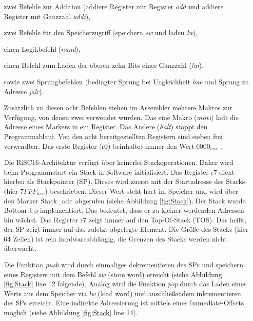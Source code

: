 \documentclass[fleqn, a4paper, 11pt]{article}       %
\begin{document}
\begin{compactitem}
     \item zwei Befehle zur Addition (addiere Register mit Register \emph{add} und addiere Register mit Ganzzahl \emph{addi}),
     \item zwei Befehle für den Speicherzugriff (speichern \emph{sw} und laden \emph{lw}),
     \item einen Logikbefehl (\emph{nand}),
     \item einen Befehl zum Laden der oberen zehn Bits einer Ganzzahl (\emph{lui}),
     \item sowie zwei Sprungbefehlen (bedingter Sprung bei Ungleichheit \emph{bne} und Sprung zu Adresse \emph{jalr}).
 \end{compactitem}


\noindent Zusätzlich zu diesen acht Befehlen stehen im Assembler mehrere Makros zur Verfügung, von denen zwei verwendet wurden. Das eine Makro (\emph{movi}) lädt die Adresse eines Markers in ein Register. Das Andere (\emph{halt}) stoppt den Programmablauf. Von den acht bereitgestellten Registern sind sieben frei verwendbar. Das erste Register (r0) beinhaltet immer den Wert $0000_{hex}$ \cite[1]{JACOBInstr}.


Die RiSC16-Architektur verfügt über keinerlei Stackoperationen. Daher wird beim Programmstart ein Stack in Software initialisiert. Das Register r7 dient hierbei als Stackpointer (SP). Dieses wird zuerst mit der Startadresse des Stacks (hier $7FFF_{hex}$) beschrieben. Dieser Wert steht hart im Speicher und wird über den Marker \glqq Stack\_adr\grqq \ abgerufen (siehe  Abbildung \ref{fig:Stack}).
Der Stack wurde   Bottom-Up implementiert. Das bedeutet, dass er zu kleiner werdenden Adressen hin wächst. Das Register r7 zeigt immer auf den Top-Of-Stack (TOS). Das heißt, der SP zeigt immer auf das zuletzt abgelegte Element. Die Größe des Stacks (hier 64 Zeilen) ist rein hardwareabhängig, die Grenzen des Stacks werden nicht überwacht.

Die Funktion \emph{push}  wird durch einmaliges dekrementieren des SPs und speichern eines Registers mit dem Befehl \emph{sw} (store word) erreicht (siehe Abbildung \ref{fig:Stack} line 12 folgende). Analog wird die Funktion \emph{pop} durch das Laden eines Werts aus dem Speicher via \emph{lw} (load word) und anschließendem inkrementieren des SPs erreicht. Eine indirekte Adressierung ist mittels eines Immediate-Offsets möglich (siehe Abbildung \ref{fig:Stack} line 14).
\end{document}

